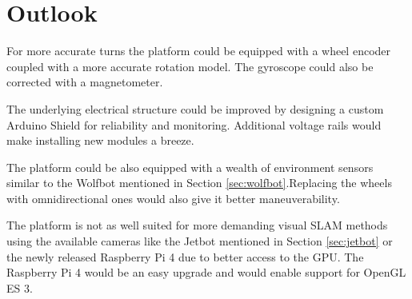 \documentclass[class=report, crop=false]{standalone}
\begin{document}
\chapter{Outlook}\label{cha:outlook}

For more accurate turns the platform could be equipped with a wheel encoder  coupled with a more accurate rotation model. The gyroscope could also be corrected with a magnetometer.

The underlying electrical structure could be improved by designing a custom Arduino Shield for reliability and monitoring. Additional voltage rails would make installing new modules a breeze.

The platform could be also equipped with a wealth of environment sensors similar to the Wolfbot mentioned in Section \ref{sec:wolfbot}.Replacing the wheels with omnidirectional ones would also give it better maneuverability.

The platform is not as well suited for more demanding visual SLAM methods using the available cameras like the Jetbot mentioned in Section \ref{sec:jetbot} or the newly released Raspberry Pi 4 due to better access to the GPU. The Raspberry Pi 4 would be an easy upgrade and would enable support for OpenGL ES 3\footnotemark.

\end{document}
